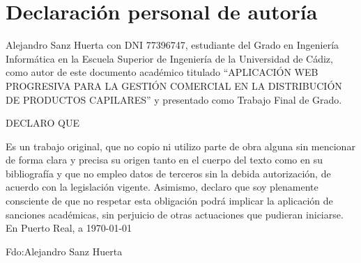 \newpage{\ }
\thispagestyle{empty}

\clearpage\setcounter{page}{-1} %

\chapter*{Declaración personal de autoría}

\vspace{15mm}

\noindent Alejandro Sanz Huerta con DNI 77396747, estudiante del Grado en Ingeniería Informática en la Escuela Superior de Ingeniería de la Universidad de Cádiz, como autor de este documento académico titulado ``APLICACIÓN WEB PROGRESIVA PARA LA GESTIÓN COMERCIAL EN LA DISTRIBUCIÓN DE PRODUCTOS CAPILARES'' y presentado como Trabajo Final de Grado.
\vspace{15mm}


DECLARO QUE \\
\vspace{1mm}

\noindent Es un trabajo original, que no copio ni utilizo parte de obra alguna sin mencionar de forma clara y precisa su origen tanto en el cuerpo del texto como en su bibliografía y que no empleo datos de terceros sin la debida autorización, de acuerdo con la legislación vigente. Asimismo, declaro que soy plenamente consciente de que no respetar esta obligación podrá implicar  la  aplicación de sanciones académicas, sin perjuicio de otras actuaciones que pudieran iniciarse.
En Puerto Real, a \today 

\vspace{15mm}
\noindent Fdo:\hspace{1em}Alejandro Sanz Huerta
